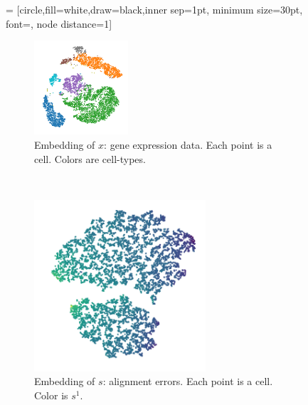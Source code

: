 \begin{figure}[h!]

    
    
       = [circle,fill=white,draw=black,inner sep=1pt,
minimum size=30pt, font=\fontsize{15}{15}\selectfont, node distance=1]


  \newcommand{\ltkiz}{1cm}
  
  
\captionsetup[subfigure]{justification=centering}
    \centering  
    \begin{subfigure}[t]{0.3\textwidth}
        \centering   
		\includegraphics[width=3.5cm]{figures/cell_types.pdf}
        \caption{Embedding of $x$: gene expression data. Each point is a cell. Colors are cell-types.}
    \end{subfigure}%
    ~  
    \begin{subfigure}[t]{0.3\textwidth}
        \centering  
		\includegraphics[width=0.7\textwidth]{figures/qc.pdf}
        \caption{Embedding of $s$: alignment errors. Each point is a cell. Color is $s^1$.}
    \end{subfigure}
    ~
    \begin{subfigure}[t]{0.3\textwidth}
        \centering  

\end{subfigure}
\end{figure}
